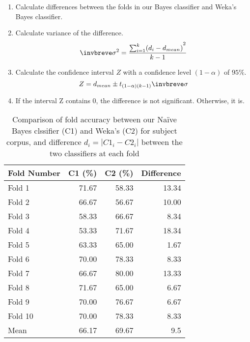\documentclass[10pt, a4paper]{article}
\begin{document}
\begin{enumerate}
\item Calculate differences between the folds in our Bayes classifier and Weka's Bayes classifier.
\item Calculate variance of the difference.
$$ \invbreve\sigma ^{2} = \frac{ {\sum\nolimits_{i=1}^k (d_{i}-d_{mean})}^2 }{k-1} $$
\item Calculate the confidence interval $Z$ with a confidence level $(1-\alpha)$ of $95\%$.
$$ Z = d_{mean} \pm t_{(1-\alpha)(k-1)} \invbreve\sigma $$
\item If the interval Z contains 0, the difference is not significant. Otherwise, it is.
\end{enumerate}

\begin{table}[H]
\centering
\caption{Comparison of fold accuracy between our Na\"ive Bayes clssifier (C1) and Weka's (C2) for subject corpus, and difference $d_{i} = | C1_{i} - C2_{i} |$ between the two classifiers at each fold}
\begin{tabular}{@{}lrrr@{}}
\toprule
\textbf{Fold Number} & \textbf{C1 (\%)} & \textbf{C2 (\%)}
	& \textbf{Difference} \\
\midrule
Fold 1 & 71.67 & 58.33 & 13.34 \\
Fold 2 & 66.67 & 56.67 & 10.00 \\
Fold 3 & 58.33 & 66.67 & 8.34 \\
Fold 4 & 53.33 & 71.67 & 18.34 \\
Fold 5 & 63.33 & 65.00 & 1.67 \\
Fold 6 & 70.00 & 78.33 & 8.33 \\
Fold 7 & 66.67 & 80.00 & 13.33 \\
Fold 8 & 71.67 & 65.00 & 6.67 \\
Fold 9 & 70.00 & 76.67 & 6.67 \\
Fold 10 & 70.00 & 78.33 & 8.33 \\
\bottomrule
Mean & 66.17 & 69.67 & 9.5 \\
\bottomrule
\end{tabular}
\label{table:diffsubj}
\end{table}
\end{document}
